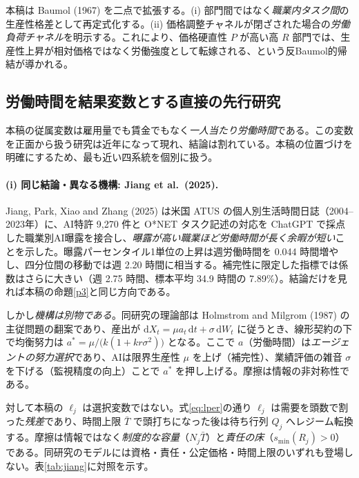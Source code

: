 \documentclass[11pt]{article}
\theoremstyle{plain}
\theoremstyle{definition}
\theoremstyle{remark}
\begin{document}
本稿は Baumol (1967) を二点で拡張する。(i) 部門間ではなく\emph{職業内タスク間}の生産性格差として再定式化する。(ii) 価格調整チャネルが閉ざされた場合の\emph{労働負荷チャネル}を明示する。これにより、価格硬直性 $P$ が高い高 $R$ 部門では、生産性上昇が相対価格ではなく労働強度として転嫁される、という反Baumol的帰結が導かれる。

\subsection{労働時間を結果変数とする直接の先行研究}\label{sec:hours}
本稿の従属変数は雇用量でも賃金でもなく\emph{一人当たり労働時間}である。この変数を正面から扱う研究は近年になって現れ、結論は割れている。本稿の位置づけを明確にするため、最も近い四系統を個別に扱う。

\paragraph{(i) 同じ結論・異なる機構: Jiang et al.\ (2025).}
Jiang, Park, Xiao and Zhang (2025) は米国 ATUS の個人別生活時間日誌（2004--2023年）に、AI特許 9{,}270 件と O*NET タスク記述の対応を ChatGPT で採点した職業別AI曝露を接合し、\emph{曝露が高い職業ほど労働時間が長く余暇が短い}ことを示した。曝露パーセンタイル1単位の上昇は週労働時間を 0.044 時間増やし、四分位間の移動では週 2.20 時間に相当する。補完性に限定した指標では係数はさらに大きい（週 2.75 時間、標本平均 34.9 時間の 7.89\%）。結論だけを見れば本稿の命題\ref{p3}と同じ方向である。

しかし\emph{機構は別物である}。同研究の理論部は Holmstrom and Milgrom (1987) の主従問題の翻案であり、産出が $\mathrm dX_t=\mu a_t\,\mathrm dt+\sigma\,\mathrm dW_t$ に従うとき、線形契約の下で均衡努力は $a^{*}=\mu/\bigl(k(1+kr\sigma^{2})\bigr)$ となる。ここで $a$（労働時間）は\emph{エージェントの努力選択}であり、AIは限界生産性 $\mu$ を上げ（補完性）、業績評価の雑音 $\sigma$ を下げる（監視精度の向上）ことで $a^{*}$ を押し上げる。摩擦は情報の非対称性である。

対して本稿の $\ell_j$ は選択変数ではない。式\eqref{eq:lper}の通り $\ell_j$ は需要を頭数で割った\emph{残差}であり、時間上限 $\bar T$ で頭打ちになった後は待ち行列 $Q_j$ へレジーム転換する。摩擦は情報ではなく\emph{制度的な容量}（$N_j\bar T$）と\emph{責任の床}（$s_{\min}(R_j)>0$）である。同研究のモデルには資格・責任・公定価格・時間上限のいずれも登場しない。表\ref{tab:jiang}に対照を示す。
\end{document}
